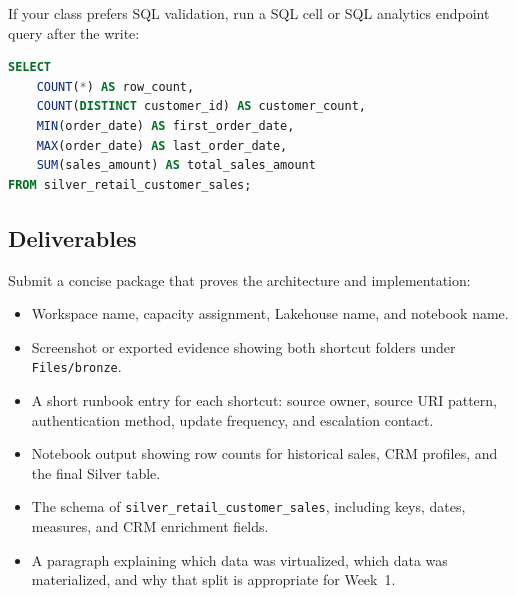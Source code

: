 If your class prefers SQL validation, run a SQL cell or SQL analytics endpoint query after the write:

\begin{lstlisting}[language=SQL,caption={SQL validation for the Silver customer sales table.}]
SELECT
    COUNT(*) AS row_count,
    COUNT(DISTINCT customer_id) AS customer_count,
    MIN(order_date) AS first_order_date,
    MAX(order_date) AS last_order_date,
    SUM(sales_amount) AS total_sales_amount
FROM silver_retail_customer_sales;
\end{lstlisting}

\subsection*{Deliverables}
Submit a concise package that proves the architecture and implementation:
\begin{itemize}
    \item Workspace name, capacity assignment, Lakehouse name, and notebook name.
    \item Screenshot or exported evidence showing both shortcut folders under \texttt{Files/bronze}.
    \item A short runbook entry for each shortcut: source owner, source URI pattern, authentication method, update frequency, and escalation contact.
    \item Notebook output showing row counts for historical sales, CRM profiles, and the final Silver table.
    \item The schema of \texttt{silver\_retail\_customer\_sales}, including keys, dates, measures, and CRM enrichment fields.
    \item A paragraph explaining which data was virtualized, which data was materialized, and why that split is appropriate for Week~1.
\end{itemize}

